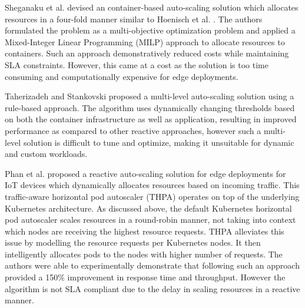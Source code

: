 Sheganaku et al. \cite{sheganaku2023cost} devised an container-based auto-scaling solution which allocates resources in a four-fold manner similar to Hoenisch et al. \cite{hoenisch2015four}. The authors formulated the problem as a multi-objective optimization problem and applied a Mixed-Integer Linear Programming (MILP) approach to allocate resources to containers. Such an approach demonstratively reduced costs while maintaining SLA constraints. However, this came at a cost as the solution is too time consuming and computationally expensive for edge deployments.\par

Taherizadeh and Stankovski \cite{taherizadeh2019dynamic} proposed a multi-level auto-scaling solution using a rule-based approach. The algorithm uses dynamically changing thresholds based on both the container infrastructure as well as application, resulting in improved performance as compared to other reactive approaches, however such a multi-level solution is difficult to tune and optimize, making it unsuitable for dynamic and custom workloads.\par

Phan et al. \cite{phan2022traffic} proposed a reactive auto-scaling solution for edge deployments for IoT devices which dynamically allocates resources based on incoming traffic. This traffic-aware horizontal pod autoscaler (THPA) operates on top of the underlying Kubernetes architecture. As discussed above, the default Kubernetes horizontal pod autoscaler scales resources in a round-robin manner, not taking into context which nodes are receiving the highest resource requests. THPA alleviates this issue by modelling the resource requests per Kubernetes nodes. It then intelligently allocates pods to the nodes with higher number of requests. The authors were able to experimentally demonstrate that following such an approach provided a 150\% improvement in response time and throughput. However the algorithm is not SLA compliant due to the delay in scaling resources in a reactive manner.


